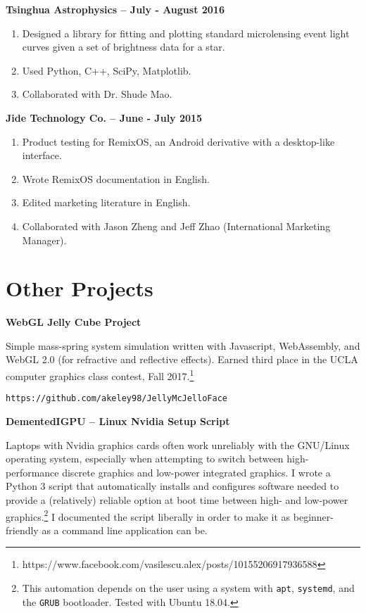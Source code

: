 \documentclass[11pt]{article}
\begin{document}
\textbf{Tsinghua Astrophysics -- July - August 2016}
\begin{enumerate}
\item Designed a library for fitting and plotting standard
  microlensing event light curves given a set of brightness
  data for a star.
\item Used Python, C++, SciPy, Matplotlib.
\item Collaborated with Dr. Shude Mao.
\end{enumerate}

\textbf{Jide Technology Co. -- June - July 2015}
\begin{enumerate}
\item Product testing for RemixOS, an Android derivative with a
  desktop-like interface.

\item Wrote RemixOS documentation in English.

\item Edited marketing literature in English.

\item Collaborated with Jason Zheng and Jeff Zhao (International
  Marketing Manager).
\end{enumerate}

\section{Other Projects}

\textbf{WebGL Jelly Cube Project}

Simple mass-spring system simulation written with Javascript,
WebAssembly, and WebGL 2.0 (for refractive and reflective effects).
Earned third place in the UCLA computer graphics class contest, Fall
2017.\footnote{
  https://www.facebook.com/vasilescu.alex/posts/10155206917936588}

\quad\texttt{https://github.com/akeley98/JellyMcJelloFace}

\textbf{DementedIGPU -- Linux Nvidia Setup Script}

Laptops with Nvidia graphics cards often work unreliably with the
GNU/Linux operating system, especially when attempting to switch
between high-performance discrete graphics and low-power integrated
graphics. I wrote a Python 3 script that automatically installs and
configures software needed to provide a (relatively) reliable option
at boot time between high- and low-power graphics.\footnote{This
  automation depends on the user using a system with \texttt{apt},
  \texttt{systemd}, and the \texttt{GRUB} bootloader. Tested with
  Ubuntu 18.04.} I documented the script liberally in order to make it
as beginner-friendly as a command line application can be.
\end{document}
